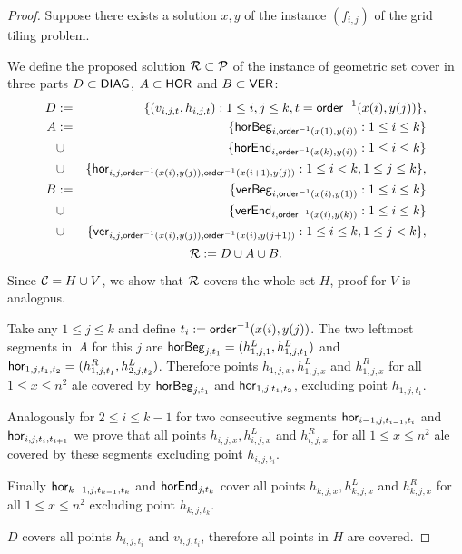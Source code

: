 \begin{proof}
Suppose there exists a solution $x,y$ of the instance $(f_{i,j})$
of the grid tiling problem.
	
We define the proposed solution $\mathcal{R} \subset \mathcal{P}$ of the instance
of geometric set cover
in three parts $D \subset \mathsf{DIAG}$, $A \subset \mathsf{HOR}$ and $B \subset \mathsf{VER}$:
\begin{eqnarray*}
	D & := & \{(v_{i, j, t}, h_{i, j, t}) : 1 \le i, j \le k, t = \mathsf{order}^{-1}(x(i), y(j))\}, \\
	A & := & \{\mathsf{horBeg}_{i,\mathsf{order}^{-1}(x(1), y(i))} : 1 \le i \le k\} \\
	& \cup & \{\mathsf{horEnd}_{i,\mathsf{order}^{-1}(x(k), y(i))} : 1 \le i \le k\} \\
	& \cup & \{\mathsf{hor}_{i,j,\mathsf{order}^{-1}(x(i), y(j)),\mathsf{order}^{-1}(x(i+1), y(j))} : 1 \le i < k, 1 \le j \le k\}, \\
	B & := & \{\mathsf{verBeg}_{i,\mathsf{order}^{-1}(x(i), y(1))} : 1 \le i \le k\} \\
	& \cup & \{\mathsf{verEnd}_{i,\mathsf{order}^{-1}(x(i), y(k))} : 1 \le i \le k\} \\
	& \cup & \{\mathsf{ver}_{i,j,\mathsf{order}^{-1}(x(i), y(j)),\mathsf{order}^{-1}(x(i), y(j+1))} : 1 \le i \le k, 1 \le j < k\},
\end{eqnarray*}
	$$\mathcal{R} := D \cup A \cup B.$$

Since $\mathcal{C} = H \cup V$, we show that $\mathcal{R}$ covers the whole set $H$,
proof for $V$ is analogous.

Take any $1 \le j \le k$ and define $t_{i} := \mathsf{order}^{-1}(x(i), y(j))$.
The two leftmost segments in~$A$ for this $j$ are
$\mathsf{horBeg}_{j,t_1} = (h_{1,j,1}^L, h_{1, j, t_1}^L)$ and
$\mathsf{hor}_{1,j,t_1,t_2} = (h_{1,j, t_1}^R, h_{2,j,t_2}^L)$.
Therefore points $h_{1,j,x}, h_{1,j,x}^L$ and $h_{1,j,x}^R$
for all $1 \le x \le n^2$ ale covered by $\mathsf{horBeg}_{j,t_1}$ and $\mathsf{hor}_{1,j,t_1,t_2}$,
excluding point $h_{1,j,t_1}$.

Analogously for $2 \le i \le k-1$
for two consecutive segments $\mathsf{hor}_{i-1,j,t_{i-1},t_i}$
and $\mathsf{hor}_{i,j,t_i,t_{i+1}}$ we prove that 
all points $h_{i,j,x}, h_{i,j,x}^L$ and $h_{i,j,x}^R$
for all $1 \le x \le n^2$ ale covered by these segments
excluding point $h_{i,j,t_i}$.

Finally $\mathsf{hor}_{k-1,j,t_{k-1},t_k}$ and $\mathsf{horEnd}_{j,t_k}$
cover all points $h_{k,j,x}, h_{k,j,x}^L$ and $h_{k,j,x}^R$
for all ${1 \le x \le n^2}$ excluding point $h_{k,j,t_k}$.

$D$ covers all points $h_{i,j, t_i}$ and $v_{i,j,t_i}$, therefore
all points in $H$ are covered.


\end{proof}
